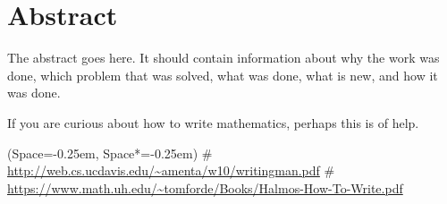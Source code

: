 \documentclass[12pt, a4paper, twoside]{report} %
\theoremstyle{plainspaced}
\theoremstyle{plainspaced}
\theoremstyle{definitionspaced}
\newcommand{\listSpace}{-0.25em}
\newcommand\blankpage{%
	\null
	\newpage}
\newenvironment{comment}{\begin{framed} \footnotesize \textcolor{red}{\textbf{Comment.}}}{\end{framed} \normalsize}
\begin{document}
	
	
	
	\pagestyle{empty}
	\afterpage{\blankpage}
	
	
	\section*{Abstract}
	\pagestyle{normal}
	
	The abstract goes here.
	It should contain information about why the work was done, which problem that was solved, what was done, what is new, and how it was done.
	
	If you are curious about how to write mathematics, perhaps this is of help.
	
	\begin{easylist}[itemize]
		\ListProperties(Space=\listSpace, Space*=\listSpace)
		# \url{http://web.cs.ucdavis.edu/~amenta/w10/writingman.pdf}
		# \url{https://www.math.uh.edu/~tomforde/Books/Halmos-How-To-Write.pdf}
	\end{easylist}
	
	
	
	
	
%	
%	
	
\end{document}
